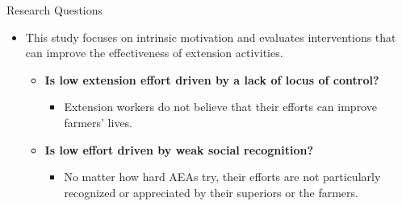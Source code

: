 \documentclass[aspectratio=169]{beamer}
\begin{document}
\begin{frame}{Research Questions} %
	\begin{itemize}
		\item This study focuses on intrinsic motivation and evaluates interventions
		that can improve the effectiveness of extension activities.
		
		\vspace{0.3cm}
		
		\begin{itemize}
			
			\item \textbf{Is low extension effort driven by a lack of locus of control?}
			\begin{itemize}
				\item Extension workers do not believe that their efforts can improve farmers' lives.
			\end{itemize}
			
			\vspace{0.3cm}
			
			\item \textbf{Is low effort driven by weak social recognition?}
			\begin{itemize}
				\item No matter how hard AEAs try, their efforts are not particularly recognized or appreciated by their superiors or the farmers. 
			\end{itemize}
			
			\vspace{0.3cm}
			
			
		\end{itemize}
		
	\end{itemize}
\end{frame}
\end{document}
